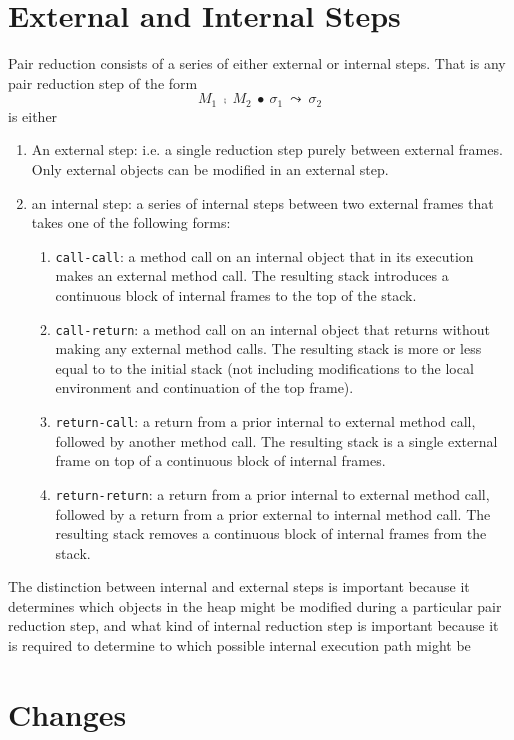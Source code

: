 \documentclass[12pt]{article}
\begin{document}
	
	\section{External and Internal Steps}
	
	Pair reduction consists of a series of either external or internal steps. That is any pair reduction step of the form
	$$M_1\ \fcmp\ M_2\ \bullet\ \sigma_1\ \leadsto\ \sigma_2$$
	is either
	\begin{enumerate}
	\item
	An external step: i.e. a single reduction step purely between external frames. Only external objects can be modified in an external step.
	\item
	an internal step: a series of internal steps between two external frames that takes one of the following forms:
	\begin{enumerate}
	\item \texttt{call-call}: a method call on an internal object that in its execution makes an external method call. The resulting stack introduces a continuous block of internal frames  to the top of the stack.
	\item \texttt{call-return}: a method call on an internal object that returns without making any external method calls. 
	The resulting stack is more or less equal to to the initial stack (not including modifications to the local environment and continuation of the top frame).
	\item \texttt{return-call}: a return from a prior internal to external method call, followed by another method call. The resulting stack is  a single external frame on top of a continuous block of internal frames.
	\item \texttt{return-return}: a return from a prior internal to external method call, followed by a return from a prior external to internal method call. The resulting stack removes a continuous block of internal frames from the stack.
	\end{enumerate}
	\end{enumerate}
	
	The distinction between internal and external steps is important because it determines which objects in the heap might be modified during a particular pair reduction step, and what kind of internal reduction step is important because it is required to determine to which possible internal execution path might be 
	
	
	\section{Changes}
	
\end{document}
